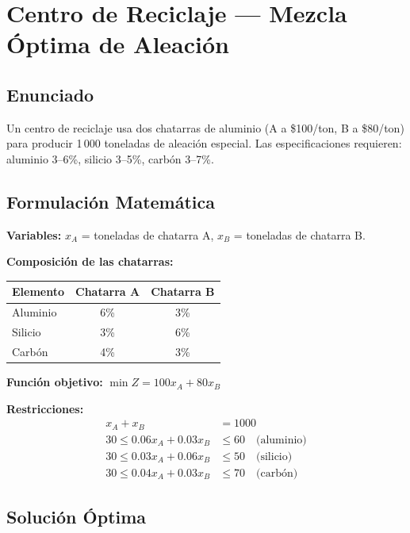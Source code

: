 \documentclass[12pt,a4paper]{article}
\begin{document}
\section{Centro de Reciclaje --- Mezcla Óptima de Aleación}

\subsection{Enunciado}

Un centro de reciclaje usa dos chatarras de aluminio (A a \$100/ton, B a \$80/ton) para producir 1\,000 toneladas de aleación especial. Las especificaciones requieren: aluminio 3--6\%, silicio 3--5\%, carbón 3--7\%.

\subsection{Formulación Matemática}

\textbf{Variables:} $x_A$ = toneladas de chatarra A, $x_B$ = toneladas de chatarra B.

\textbf{Composición de las chatarras:}

\begin{table}[h]
\centering
\begin{tabular}{lcc}
\toprule
\textbf{Elemento} & \textbf{Chatarra A} & \textbf{Chatarra B} \\
\midrule
Aluminio & 6\% & 3\% \\
Silicio & 3\% & 6\% \\
Carbón & 4\% & 3\% \\
\bottomrule
\end{tabular}
\end{table}

\textbf{Función objetivo:} $\min Z = 100x_A + 80x_B$

\textbf{Restricciones:}
\begin{align}
x_A + x_B &= 1000 \\
30 \leq 0.06x_A + 0.03x_B &\leq 60 \quad \text{(aluminio)} \\
30 \leq 0.03x_A + 0.06x_B &\leq 50 \quad \text{(silicio)} \\
30 \leq 0.04x_A + 0.03x_B &\leq 70 \quad \text{(carbón)}
\end{align}

\subsection{Solución Óptima}
\end{document}

